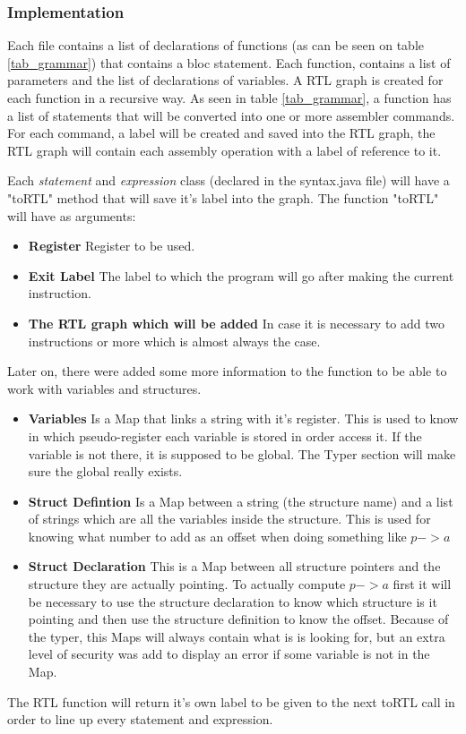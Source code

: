 \documentclass[conference]{IEEEtran}
\theoremstyle{definition}
\begin{document}
\subsubsection{Implementation}
Each file contains a list of declarations of functions (as can be seen on table \ref{tab_grammar}) that contains a bloc statement. Each function, contains a list of parameters and the list of declarations of variables.
A RTL graph is created for each function in a recursive way. As seen in table \ref{tab_grammar}, a function has a list of statements that will be converted into one or more assembler commands. For each command, a label will be created and saved into the RTL graph, the RTL graph will contain each assembly operation with a label of reference to it. 

Each \textit{statement} and \textit{expression} class (declared in the syntax.java file) will have a "toRTL" method that will save it's label into the graph. The function "toRTL" will have as arguments:
\begin{itemize}
	\item \textbf{Register} Register to be used.
	\item \textbf{Exit Label} The label to which the program will go after making the current instruction.
	\item \textbf{The RTL graph which will be added} In case it is necessary to add two instructions or more which is almost always the case.
\end{itemize}
Later on, there were added some more information to the function to be able to work with variables and structures.
\begin{itemize}
	\item \textbf{Variables} Is a Map that links a string with it's register. This is used to know in which pseudo-register each variable is stored in order access it. If the variable is not there, it is supposed to be global. The Typer section will make sure the global really exists.
	\item \textbf{Struct Defintion} Is a Map between a string (the structure name) and a list of strings which are all the variables inside the structure. This is used for knowing what number to add as an offset when doing something like $p->a$
	\item \textbf{Struct Declaration} This is a Map between all structure pointers and the structure they are actually pointing. To actually compute $p->a$ first it will be necessary to use the structure declaration to know which structure is it pointing and then use the structure definition to know the offset. Because of the typer, this Maps will always contain what is is looking for, but an extra level of security was add to display an error if some variable is not in the Map.
\end{itemize}
The RTL function will return it's own label to be given to the next toRTL call in order to line up every statement and expression.
\end{document}
